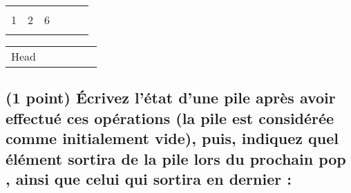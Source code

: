 \documentclass[11pt,a4paper]{article}
\begin{document}
\begin{center}
\medskip

\begin{tabular}{|C{1cm}|C{1cm}|C{1cm}|C{1cm}|C{1cm}|C{1cm}|}
\hline
  &   &   &   &   & \\
1 & 2 & 6 &   &   & \\
  &   &   &   &   & \\
\hline
\end{tabular}

\begin{tabular}{ C{1cm} C{1cm} C{1cm} C{1cm} C{1cm} C{1cm} }
 Head & & & & & \\
\end{tabular}

\end{center}



\subsection{(1 point) \'Ecrivez l'état d'une pile après avoir effectué ces opérations (la pile est considérée comme initialement vide), puis, indiquez quel élément sortira de la pile lors du prochain \og pop \fg{}, ainsi que celui qui sortira en dernier : }

\bigskip
\end{document}
